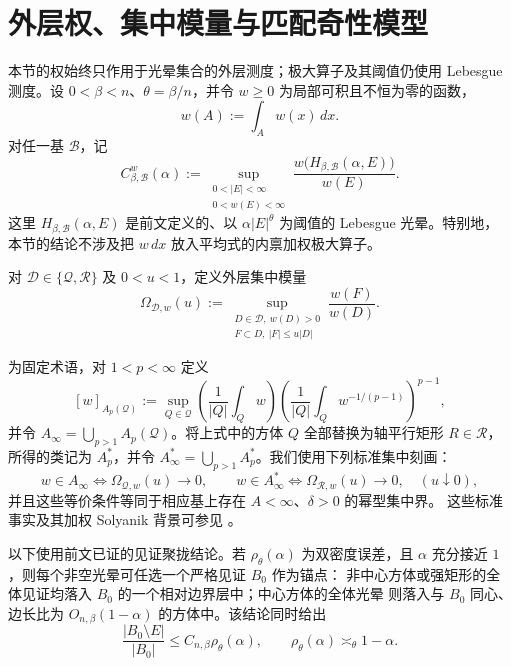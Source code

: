 \section{外层权、集中模量与匹配奇性模型}\label{sec:weights}

本节的权始终只作用于光晕集合的外层测度；极大算子及其阈值仍使用 Lebesgue 测度。设
\(0<\beta<n\)、\(\theta=\beta/n\)，并令 \(w\geq0\) 为局部可积且不恒为零的函数，
\[
 w(A):=\int_Aw(x)\,dx.
\]
对任一基 \(\mathcal B\)，记
\[
 C^w_{\beta,\mathcal B}(\alpha)
 :=\sup_{\substack{0<|E|<\infty\\0<w(E)<\infty}}
 \frac{w\bigl(H_{\beta,\mathcal B}(\alpha,E)\bigr)}{w(E)}.
\]
这里 \(H_{\beta,\mathcal B}(\alpha,E)\) 是前文定义的、以
\(\alpha|E|^\theta\) 为阈值的 Lebesgue 光晕。特别地，本节的结论不涉及把
\(w\,dx\) 放入平均式的内禀加权极大算子。

\begin{definition}\label{wgt:definition-concentration}
对 \(\mathcal D\in\{\mathcal Q,\mathcal R\}\) 及 \(0<u<1\)，定义外层集中模量
\[
 \Omega_{\mathcal D,w}(u)
 :=\sup_{\substack{D\in\mathcal D,\ w(D)>0\\ F\subset D,\ |F|\leq u|D|}}
 \frac{w(F)}{w(D)}.
\]
\end{definition}

为固定术语，对 \(1<p<\infty\) 定义
\[
 [w]_{A_p(\mathcal Q)}
 :=\sup_{Q\in\mathcal Q}
 \left(\frac1{|Q|}\int_Qw\right)
 \left(\frac1{|Q|}\int_Qw^{-1/(p-1)}\right)^{p-1},
\]
并令 \(A_\infty=\bigcup_{p>1}A_p(\mathcal Q)\)。将上式中的方体 \(Q\) 全部替换为轴平行矩形
\(R\in\mathcal R\)，所得的类记为 \(A_p^\ast\)，并令
\(A_\infty^\ast=\bigcup_{p>1}A_p^\ast\)。我们使用下列标准集中刻画：
\[
 w\in A_\infty\Longleftrightarrow\Omega_{\mathcal Q,w}(u)\longrightarrow0,
 \qquad
 w\in A_\infty^\ast\Longleftrightarrow\Omega_{\mathcal R,w}(u)\longrightarrow0,
 \quad(u\downarrow0),
\]
并且这些等价条件等同于相应基上存在 \(A<\infty\)、\(\delta>0\) 的幂型集中界。
这些标准事实及其加权 Solyanik 背景可参见
\cite{HagelsteinParissis2016,HagelsteinParissis2018}。

以下使用前文已证的见证聚拢结论。若 \(\rho_\theta(\alpha)\) 为双密度误差，且
\(\alpha\) 充分接近 \(1\)，则每个非空光晕可任选一个严格见证 \(B_0\) 作为锚点：
非中心方体或强矩形的全体见证均落入 \(B_0\) 的一个相对边界层中；中心方体的全体光晕
则落入与 \(B_0\) 同心、边长比为 \(O_{n,\beta}(1-\alpha)\) 的方体中。该结论同时给出
\begin{equation}
 \frac{|B_0\setminus E|}{|B_0|}\leq C_{n,\beta}\rho_\theta(\alpha),
 \qquad \rho_\theta(\alpha)\asymp_\theta1-\alpha.
\label{wgt:anchor-estimates}
\end{equation}

